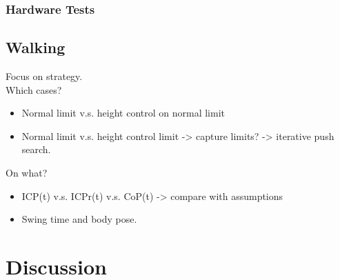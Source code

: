 \subsubsection{Hardware Tests}
\subsection{Walking}
Focus on strategy.\\
Which cases? 
\begin{itemize}
	\item Normal limit v.s. height control on normal limit
	\item Normal limit v.s. height control limit -> capture limits? -> iterative push search.
\end{itemize}

On what?
\begin{itemize}
	\item ICP(t) v.s. ICPr(t) v.s. CoP(t) -> compare with assumptions
	\item Swing time and body pose.
\end{itemize}


\section{Discussion}
